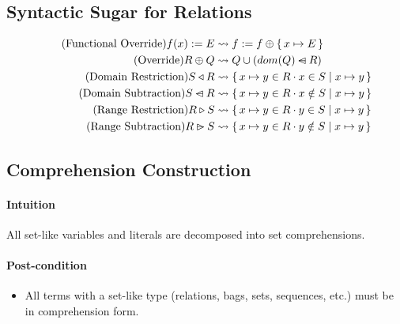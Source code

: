 \subsection{Syntactic Sugar for Relations}
\noindent\begin{minipage}{\linewidth}
\begin{align}
  \tag{Functional Override}
  f(x) := E
  &\leadsto
  f := f \oplus \Set{x \mapsto E}
  \\
  \tag{Override}
  R \oplus Q &\leadsto Q \cup (dom(Q) \domsub R)
  \\
  \tag{Domain Restriction}
  S \triangleleft R &\leadsto \Set{x \mapsto y \in R}{x \in S}{x \mapsto y}
  \\
  \tag{Domain Subtraction}
  S \domsub R &\leadsto \Set{x \mapsto y \in R}{x \notin S}{x \mapsto y}
  \\
  \tag{Range Restriction}
  R \triangleright S &\leadsto \Set{x \mapsto y \in R}{y \in S}{x \mapsto y}
  \\
  \tag{Range Subtraction}
  R \ransub S &\leadsto \Set{x \mapsto y \in R}{y \notin S}{x \mapsto y}
\end{align}
\end{minipage}

\subsection{Comprehension Construction}

\paragraph{Intuition} All set-like variables and literals are decomposed into set comprehensions.

\paragraph{Post-condition}
\begin{itemize}
  \item All terms with a set-like type (relations, bags, sets, sequences, etc.) must be in comprehension form.
\end{itemize}



